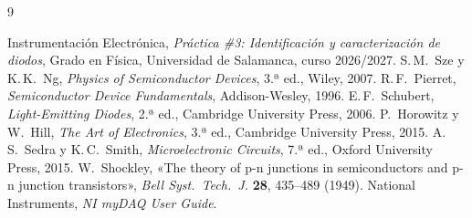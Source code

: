 \documentclass[11pt,a4paper]{article}
\begin{document}
\begin{thebibliography}{9}
\small
{} Instrumentación Electrónica, \emph{Práctica \#3:
  Identificación y caracterización de diodos}, Grado en Física, Universidad de
  Salamanca, curso 2026/2027.
 S.\,M.~Sze y K.\,K.~Ng, \emph{Physics of Semiconductor Devices},
  3.ª ed., Wiley, 2007.
 R.\,F.~Pierret, \emph{Semiconductor Device Fundamentals},
  Addison-Wesley, 1996.
 E.\,F.~Schubert, \emph{Light-Emitting Diodes}, 2.ª ed.,
  Cambridge University Press, 2006.
 P.~Horowitz y W.~Hill, \emph{The Art of Electronics},
  3.ª ed., Cambridge University Press, 2015.
 A.\,S.~Sedra y K.\,C.~Smith, \emph{Microelectronic Circuits},
  7.ª ed., Oxford University Press, 2015.
 W.~Shockley, «The theory of p-n junctions in
  semiconductors and p-n junction transistors», \emph{Bell Syst.\ Tech.\ J.}
  \textbf{28}, 435--489 (1949).
 National Instruments, \emph{NI myDAQ User Guide}.
\end{thebibliography}
\end{document}
